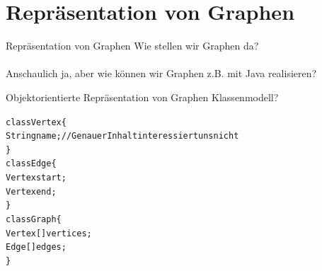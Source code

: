 \def\tutdate{19.01.2017}


\section{Repräsentation von Graphen}
\begin{frame}{Repräsentation von Graphen}
	Wie stellen wir Graphen da?\\\ip
	\\
	Anschaulich ja, aber wie können wir Graphen z.B. mit Java realisieren?
\end{frame}

\begin{frame}{Objektorientierte Repräsentation von Graphen}
	Klassenmodell?\pause
	
	\begin{alltt}
		class Vertex \{ 					\\                                  
		\hspace{0.4cm} String name; //Genauer Inhalt interessiert uns nicht	\\                               
		\}   
		\vspace{0.3cm}        			\\               
		class Edge \{ 					\\ 
		\hspace{0.4cm}	Vertex start;    \\
		\hspace{0.4cm}	Vertex end;     \\
		\}  
		\vspace{0.3cm}                    \\               
		class Graph \{					\\
		\hspace{0.4cm}   Vertex[] vertices;\\
		\hspace{0.4cm}   Edge[] edges;	\\
		\}								\\
	\end{alltt}
\end{frame}

